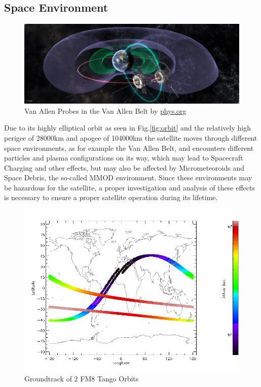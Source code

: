 \subsection{Space Environment}

\begin{figure}[h]
	\centering
	\includegraphics[width=\linewidth]{images/mysteriesofe}
		\caption{Van Allen Probes in the Van Allen Belt by \href{http://cdn.phys.org/newman/gfx/news/hires/2013/mysteriesofe.jpg}{phys.org}}
	\label{fig:worldmap}
\end{figure}

Due to its highly elliptical orbit as seen in Fig.\ref{fig:orbit} and the relatively high perigee of 28000km and apogee of 104000km the satellite moves through different space environments, as for example the Van Allen Belt, and encounters different particles and plasma configurations on its way, which may lead to Spacecraft Charging and other effects, but may also be affected by Micrometeoroids and Space Debris, the so-called MMOD environment. Since these environments may be hazardous for the satellite, a proper investigation and analysis of these effects is necessary to ensure a proper satellite operation during its lifetime.

\begin{figure}[H]
	\centering
	\includegraphics[width=\linewidth-15em]{spenvis/worldmap_2_orb}
		\caption{Groundtrack of 2 FM8 Tango Orbits}
	\label{fig:worldmap}
\end{figure}

